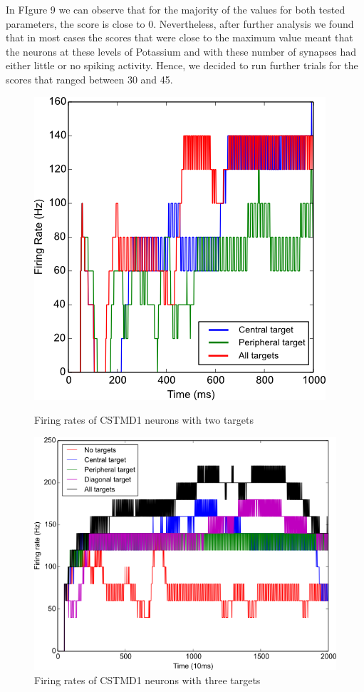\documentclass[a4paper,11pt]{article}
\begin{document}
In FIgure 9 we can observe that for the majority of the values for both tested parameters, the score is close to 0. Nevertheless, after further analysis we found that in most cases the scores that were close to the maximum value meant that the neurons at these levels of Potassium and with these number of synapses had either little or no spiking activity. Hence, we decided to run further trials 
for the scores that ranged between 30 and 45.
\begin{figure}[H]
\begin{minipage}{0.5\textwidth}
\centering
\includegraphics[scale = 0.5]{cstmd_2tars}
\caption{Firing rates of CSTMD1 neurons with two targets}
\end{minipage}
\begin{minipage}{0.5\textwidth}
\centering
\includegraphics[scale = 0.43]{cstmd_3tars}
\caption{Firing rates of CSTMD1 neurons with three targets}
\end{minipage}
\end{figure}
\end{document}
